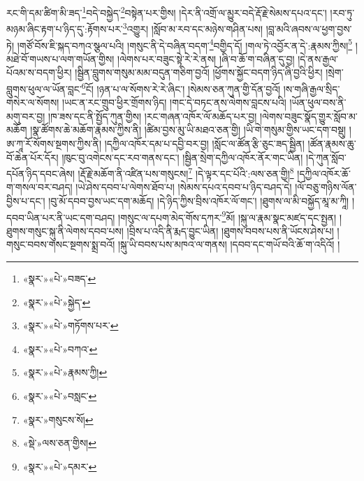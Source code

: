 རང་གི་དམ་ཚིག་མི་ཟད་\footnote{«སྣར་»«པེ་»བཟད་}བདེ་བསྐྱེད་\footnote{«སྣར་»«པེ་»སྐྱེད་}བསྟེན་པར་གྱིས། །དེར་ནི་འགྲོ་ལ་མྱུར་བདེ་རྡོ་རྗེ་སེམས་དཔའ་དང་། །རབ་ཏུ་མཉམ་ཞིང་རྟག་པ་ཉིད་དུ་:རྟོགས་པར་\footnote{«སྣར་»«པེ་»གཏོགས་པར་}འགྱུར། །སློབ་མ་རབ་དང་མཉེས་གཤིན་པས། །བླ་མའི་ཞབས་ལ་ཕྱག་བྱས་ཏེ། །གཙོ་བོས་ཇི་སྐད་བཀའ་སྩལ་པའི། །གསུང་ནི་དེ་བཞིན་བདག་\footnote{«སྣར་»«པེ་»བཀའ་}བགྱིད་དོ། །གལ་ཏེ་འབྱོར་ན་དེ་:རྣམས་ཀྱིས།\footnote{«སྣར་»«པེ་»རྣམས་ཀྱི།} །མཐེ་བོ་གཡས་པ་ལག་གཡོན་གྱིས། །ལེགས་པར་བཟུང་སྟེ་རེ་རེ་ནས། །ཞི་བ་ཆོ་ག་བཞིན་དུ་བྱ། །དེ་ནས་རྒྱལ་པོའམ་ས་བདག་ཕྱིར། །སྦྱིན་བླུགས་གསུམ་མམ་བདུན་གཅིག་བྱའོ། །ཕྱོགས་སྐྱོང་བདག་ཉིད་ཞི་བྱའི་ཕྱིར། །སྲེག་བླུགས་ཕུལ་ལ་ཡོན་བླང་\footnote{«སྣར་»«པེ་»བསླང་}ངོ། །ཉན་པ་ལ་སོགས་རེ་རེ་ཞིང་། །སེམས་ཅན་ཀུན་གྱི་དོན་བྱའོ། །ས་གཞི་རྒྱལ་སྲིད་གསེར་ལ་སོགས། །ཡང་ན་རང་གྲུབ་ཕྱིར་གྲོགས་ཉིད། །གང་དེ་བཏང་ནས་ལེགས་བླངས་པའི། །ཡོན་ཕུལ་བས་ནི་མགུ་བར་བྱ། །ཁ་ཟས་དང་ནི་སྤྱོད་ཀུན་གྱིས། །རང་གཞན་འཁོར་ལོ་མཆོད་པར་བྱ། །ལེགས་བཟུང་སྣོད་གྱུར་སློབ་མ་མཆོག །སྣ་ཚོགས་ཆེ་མཆོག་རྣམས་ཀྱིས་ནི། །ཚིམ་བྱས་མུ་ཡི་མཐའ་ཅན་གྱི། །ཡི་གེ་གསུམ་གྱིས་ཡང་དག་བསྡུ། །ཨ་ཀཱ་རོ་སོགས་སྔགས་ཀྱིས་ནི། །དཀྱིལ་འཁོར་དམ་པ་དབྱི་བར་བྱ། །སློང་ལ་ཚོན་རྩི་ཅུང་ཟད་སྦྱིན། །ཚོན་རྣམས་ཆུ་བོ་ཆེན་པོར་དོར། །ཁུང་བུ་འགེངས་དང་རབ་གནས་དང་། །སྦྱིན་སྲེག་དཀྱིལ་འཁོར་ནོར་གང་ཡིན། །དེ་ཀུན་སློབ་དཔོན་ཉིད་དབང་ཞེས། །རྡོ་རྗེ་མཆོག་ནི་འཛིན་པས་གསུངས།\footnote{«སྣར་»གསུངས་སོ།} །དེ་ལྟར་དང་པོའི་:ལས་ཅན་གྱི།\footnote{«སྡེ་»ལས་ཅན་གྱིས།} །དཀྱིལ་འཁོར་ཆོ་ག་གསལ་བར་བཤད། །ཡེ་ཤེས་དབབ་པ་ལེགས་ཐོབ་པ། །སེམས་དཔའ་དབབ་པ་ཉིད་བཤད་དེ། །ལོ་བཅུ་གཉིས་ལོན་བྱིས་པ་དང་། །བུ་མོ་དབབ་བྱས་ཡང་དག་མཆོད། །དེ་ཉིད་ཀྱིས་བྲིས་འཁོར་ལོ་གང་། །ཐུགས་ལ་མི་བསྐྱོད་མཱ་མ་ཀཱི། །དབབ་ཡིན་པར་ནི་ཡང་དག་བཤད། །གསུང་ལ་དཔག་མེད་གོས་དཀར་\footnote{«སྣར་»«པེ་»དམར་}མོ། །སྐུ་ལ་རྣམ་སྣང་མཛད་དང་སྤྱན། །ཐུགས་གསུང་སྐུ་ནི་ལེགས་དབབ་པས། །བྲིས་པ་འདི་ནི་རྨད་བྱུང་ཡིན། །ཐུགས་བབས་པས་ནི་ཡོངས་ཤེས་པ། །གསུང་བབས་གསང་སྔགས་སྨྲ་བའོ། །སྐུ་ཡི་བབས་པས་མཁའ་ལ་གནས། །དབབ་དང་གཡོ་བའི་ཆོ་ག་འདིའོ། །
